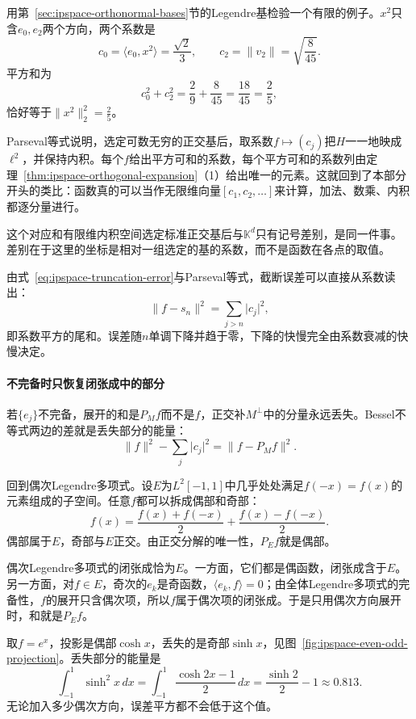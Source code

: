 用第~\ref{sec:ipspace-orthonormal-bases}节的Legendre基检验一个有限的例子。$x^2$只含$e_0,e_2$两个方向，两个系数是
\[
 c_0=\langle e_0,x^2\rangle=\frac{\sqrt2}3,\qquad c_2=\lVert v_2\rVert=\sqrt{\frac8{45}} .
\]
平方和为
\[
 c_0^2+c_2^2=\frac29+\frac8{45}=\frac{18}{45}=\frac25 ,
\]
恰好等于$\lVert x^2\rVert_2^2=\tfrac25$。

Parseval等式说明，选定可数无穷的正交基后，取系数$f\mapsto(c_j)$把$H$一一地映成$\ell^2$，并保持内积。每个$f$给出平方可和的系数，每个平方可和的系数列由定理~\ref{thm:ipspace-orthogonal-expansion}（1）给出唯一的元素。这就回到了本部分开头的类比：函数真的可以当作无限维向量$[c_1,c_2,\ldots]$来计算，加法、数乘、内积都逐分量进行。

这个对应和有限维内积空间选定标准正交基后与$\mathbb K^d$只有记号差别，是同一件事。差别在于这里的坐标是相对一组选定的基的系数，而不是函数在各点的取值。

由式~\eqref{eq:ipspace-truncation-error}与Parseval等式，截断误差可以直接从系数读出：
\begin{equation}
 \lVert f-s_n\rVert^2=\sum_{j>n}\lvert c_j\rvert^2 ,
 \label{eq:ipspace-tail-error}
\end{equation}
即系数平方的尾和。误差随$n$单调下降并趋于零，下降的快慢完全由系数衰减的快慢决定。

\paragraph{不完备时只恢复闭张成中的部分}
若$\{e_j\}$不完备，展开的和是$P_Mf$而不是$f$，正交补$M^\perp$中的分量永远丢失。Bessel不等式两边的差就是丢失部分的能量：
\[
 \lVert f\rVert^2-\sum_j\lvert c_j\rvert^2=\lVert f-P_Mf\rVert^2 .
\]

回到偶次Legendre多项式。设$E$为$L^2[-1,1]$中几乎处处满足$f(-x)=f(x)$的元素组成的子空间。任意$f$都可以拆成偶部和奇部：
\[
 f(x)=\frac{f(x)+f(-x)}2+\frac{f(x)-f(-x)}2 .
\]
偶部属于$E$，奇部与$E$正交。由正交分解的唯一性，$P_Ef$就是偶部。

偶次Legendre多项式的闭张成恰为$E$。一方面，它们都是偶函数，闭张成含于$E$。另一方面，对$f\in E$，奇次的$e_k$是奇函数，$\langle e_k,f\rangle=0$；由全体Legendre多项式的完备性，$f$的展开只含偶次项，所以$f$属于偶次项的闭张成。于是只用偶次方向展开时，和就是$P_Ef$。

取$f=e^x$，投影是偶部$\cosh x$，丢失的是奇部$\sinh x$，见图~\ref{fig:ipspace-even-odd-projection}。丢失部分的能量是
\[
 \int_{-1}^1\sinh^2x\,dx=\int_{-1}^1\frac{\cosh2x-1}2\,dx=\frac{\sinh2}{2}-1\approx0.813 .
\]
无论加入多少偶次方向，误差平方都不会低于这个值。


